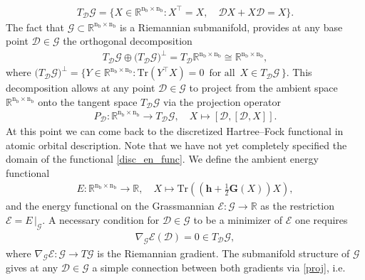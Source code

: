 \documentclass[reqno]{amsart}
\begin{document}
\begin{align}
    T_\mathscr{D}\mathcal{G}=\big\lbrace X \in \mathbb{R}^{\text{n}_\text{b}\times \text{n}_\text{b}}: X^\top=X, \quad \mathscr{D}X+X\mathscr{D}=X\big\rbrace.
\end{align}
The fact that $\mathcal{G}\subset \mathbb{R}^{\text{n}_\text{b}\times \text{n}_\text{b}} $ is a Riemannian submanifold, provides at any base point $\mathscr{D}\in \mathcal{G}$ the orthogonal decomposition 
\begin{align*}
    T_\mathscr{D}\mathcal{G}\oplus \big(T_\mathscr{D}\mathcal{G}\big)^\perp = T_\mathscr{D}\mathbb{R}^{\text{n}_\text{b}\times \text{n}_\text{b}} \cong \mathbb{R}^{\text{n}_\text{b}\times \text{n}_\text{b}},
\end{align*}
where $\big(T_\mathscr{D}\mathcal{G}\big)^\perp=\big\lbrace Y\in \mathbb{R}^{\text{n}_\text{b}\times \text{n}_\text{b}}: \text{Tr}(Y^\top X)=0 \,\,\,\text{for all}\,\,\, X\in T_\mathscr{D}\mathcal{G}\, \big \rbrace$. This decomposition allows at any point $\mathscr{D}\in \mathcal{G}$ to project from the ambient space $\mathbb{R}^{\text{n}_\text{b}\times \text{n}_\text{b}}$ onto the tangent space $T_\mathscr{D}\mathcal{G}$ via the projection operator
\begin{align}\label{proj}
   P_\mathscr{D}: \mathbb{R}^{\text{n}_\text{b}\times \text{n}_\text{b}} \longrightarrow T_\mathscr{D}\mathcal{G}, \quad X \mapsto [\mathscr{D},[\mathscr{D},X]].
\end{align}
At this point we can come back to the discretized Hartree–Fock functional in atomic orbital description. Note that we have not yet completely specified the domain of the functional \eqref{disc_en_func}. We define the ambient energy functional
\begin{align}\label{ambient energy functional}
    E:\mathbb{R}^{\text{n}_\text{b}\times \text{n}_\text{b}}\longrightarrow \mathbb{R}, \quad X \mapsto \text{Tr}((\mathbf{h}+\tfrac{1}{2}\mathbf{G}(X))X), 
\end{align}
and the energy functional on the Grassmannian $\mathcal{E}:\mathcal{G}\longrightarrow \mathbb{R}$ as the restriction $\mathcal{E}=E\,|_\mathcal{G}$. A necessary condition for $\mathscr{D}\in \mathcal{G}$ to be a minimizer of $\mathcal{E}$ one requires
\begin{align*}
    \nabla_\mathcal{G}\mathcal{E}(\mathscr{D})=0\in T_\mathscr{D}\mathcal{G},
\end{align*}
where $\nabla_\mathcal{G}\mathcal{E}:\mathcal{G}\longrightarrow T\mathcal{G}$ is the Riemannian gradient. The submanifold structure of $\mathcal{G}$ gives at any $\mathscr{D}\in \mathcal{G}$ a simple connection between both gradients via \eqref{proj}, i.e.
\end{document}
